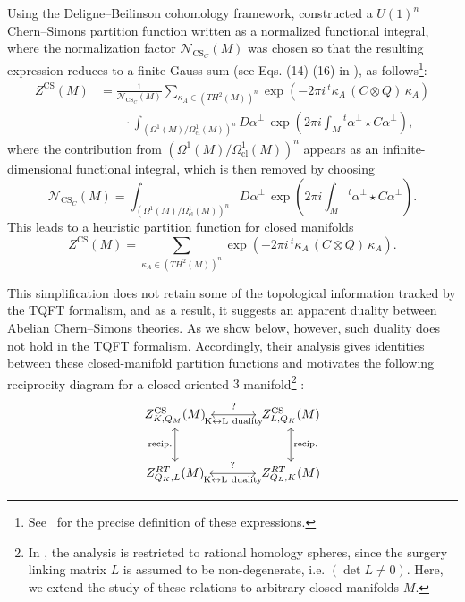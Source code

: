 \documentclass[12pt]{amsart}
\numberwithin{equation}{section}
\theoremstyle{definition}
\begin{document}
Using the Deligne--Beilinson cohomology framework, \cite{Kim2024,Tagaris2025} constructed a $U(1)^n$ Chern--Simons partition function written as a normalized functional integral, where the normalization factor $\mathcal N_{\mathrm{CS}_C}(M)$ was chosen so that the resulting expression reduces to a finite Gauss sum (see Eqs. (14)-(16) in \cite{Kim2024}), as follows\footnote{See~\cite{Kim2024,Tagaris2025} for the precise definition of these expressions.}:
$$
\begin{aligned}
Z^{\mathrm{CS}}(M)
&=
\frac{1}{\mathcal N_{\mathrm{CS}_C}(M)}
\sum_{\kappa_A\in \left(TH^{2}(M)\right)^{n}}
\exp\!\left(-2\pi i\,{}^{t}\!\kappa_A\,(C\otimes Q)\,\kappa_A\right)
\\
&\qquad\cdot
\int_{\left(\Omega^{1}(M)/\Omega^{1}_{\mathrm{cl}}(M)\right)^{n}}
D\alpha^{\perp}\,
\exp\!\left(2\pi i\int_{M} {}^{t}\!\alpha^{\perp}\star C\alpha^{\perp}\right),
\end{aligned}
$$
where the contribution from $ \left(\Omega^{1}(M)/\Omega^{1}_{\mathrm{cl}}(M)\right)^{n} $ appears as an infinite-dimensional functional integral, which is then removed by choosing
$$
\mathcal N_{\mathrm{CS}_C}(M)=
\int_{\left(\Omega^{1}(M)/\Omega^{1}_{\mathrm{cl}}(M)\right)^{n}}
D\alpha^{\perp}\,
\exp\!\left(2\pi i\int_{M} {}^{t}\!\alpha^{\perp}\star C\alpha^{\perp}\right).
$$
This leads to a heuristic partition function for closed manifolds
\begin{equation}
\label{eq:DB-partition-function}
Z^{\mathrm{CS}}(M)=
\sum_{\kappa_A\in \left(TH^{2}(M)\right)^{n}}
\exp\!\left(-2\pi i\,{}^{t}\!\kappa_A\,(C\otimes Q)\,\kappa_A\right).
\end{equation}

This simplification does not retain some of the topological information tracked by the TQFT formalism, and as a result, it suggests an apparent duality between Abelian Chern--Simons theories. As we show below, however, such duality does not hold in the TQFT formalism. Accordingly, their analysis gives identities between these closed-manifold partition functions and motivates the following reciprocity diagram for a closed oriented $3$-manifold\footnote{In \cite{Tagaris2025}, the analysis is restricted to rational homology spheres, since the surgery linking matrix $L$ is assumed to be non-degenerate, i.e. $(\det L\neq 0)$. Here, we extend the study of these relations to arbitrary closed manifolds $M$.} \cite{Tagaris2025}: 
$$
\begin{tikzcd}[column sep=large,row sep=large]
Z^{\mathrm{CS}}_{K,Q_M}(M)
\arrow[r,leftrightarrow,"\mathrm{K\leftrightarrow L\ duality}"']
\arrow[r,phantom,"\scriptstyle ?",yshift=1.6ex]
\arrow[d,leftrightarrow,"\mathrm{recip.}"']
&
Z^{\mathrm{CS}}_{L,Q_K}(M)
\arrow[d,leftrightarrow,"\mathrm{recip.}"]
\\
Z^{RT}_{Q_K,L}(M)
\arrow[r,leftrightarrow,"\mathrm{K\leftrightarrow L\ duality}"']
\arrow[r,phantom,"\scriptstyle ?",yshift=1.6ex]
&
Z^{RT}_{Q_L,K}(M)
\end{tikzcd}
$$
\end{document}
